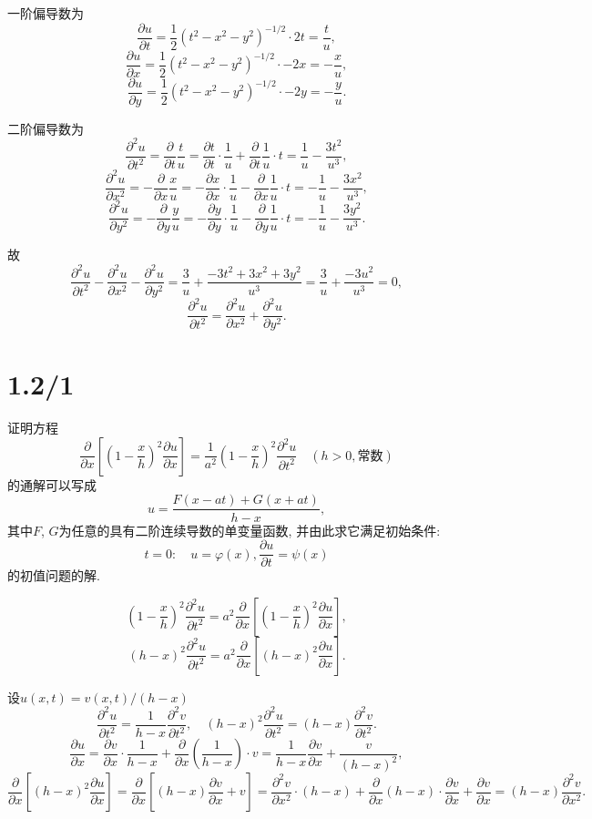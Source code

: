 \documentclass[11pt,a4paper]{article}
\begin{document}
一阶偏导数为
$$\frac{\partial u}{\partial t}=\frac{1}{2}(t^2-x^2-y^2)^{-1/2}\cdot 2t=\frac{t}{u},$$
$$\frac{\partial u}{\partial x}=\frac{1}{2}(t^2-x^2-y^2)^{-1/2}\cdot -2x=-\frac{x}{u},$$
$$\frac{\partial u}{\partial y}=\frac{1}{2}(t^2-x^2-y^2)^{-1/2}\cdot -2y=-\frac{y}{u}.$$

二阶偏导数为
$$\frac{\partial^2 u}{\partial t^2}=\frac{\partial}{\partial t}\frac{t}{u}=\frac{\partial t}{\partial t}\cdot \frac{1}{u}+\frac{\partial}{\partial t}\frac{1}{u}\cdot t=\frac{1}{u}-\frac{3t^2}{u^3},$$
$$\frac{\partial^2 u}{\partial x^2}=-\frac{\partial}{\partial x}\frac{x}{u}=-\frac{\partial x}{\partial x}\cdot \frac{1}{u}-\frac{\partial}{\partial x}\frac{1}{u}\cdot t=-\frac{1}{u}-\frac{3x^2}{u^3},$$
$$\frac{\partial^2 u}{\partial y^2}=-\frac{\partial}{\partial y}\frac{y}{u}=-\frac{\partial y}{\partial y}\cdot \frac{1}{u}-\frac{\partial}{\partial y}\frac{1}{u}\cdot t=-\frac{1}{u}-\frac{3y^2}{u^3}.$$

故
$$\frac{\partial^2 u}{\partial t^2}-\frac{\partial^2 u}{\partial x^2}-\frac{\partial^2 u}{\partial y^2}=\frac{3}{u}+\frac{-3t^2+3x^2+3y^2}{u^3}=\frac{3}{u}+\frac{-3u^2}{u^3}=0,$$
$$\frac{\partial^2 u}{\partial t^2}=\frac{\partial^2 u}{\partial x^2}+\frac{\partial^2 u}{\partial y^2}.$$

\section{1.2/1}
\begin{problem}
证明方程
$$\frac{\partial}{\partial x}\left[\left(1-\frac{x}{h}\right)^2\frac{\partial u}{\partial x}\right]=\frac{1}{a^2}\left(1-\frac{x}{h}\right)^2\frac{\partial^2u}{\partial t^2}\quad(h>0,\text{常数})$$
的通解可以写成
$$u=\frac{F(x-at)+G(x+at)}{h-x},$$
其中$F$, $G$为任意的具有二阶连续导数的单变量函数, 并由此求它满足初始条件:
$$t=0:\quad u=\varphi(x),\frac{\partial u}{\partial t}=\psi(x)$$
的初值问题的解.
\end{problem}

$$\left(1-\frac{x}{h}\right)^2\frac{\partial^2 u}{\partial t^2}=a^2\frac{\partial}{\partial x}\left[\left(1-\frac{x}{h}\right)^2\frac{\partial u}{\partial x}\right],$$
$$(h-x)^2\frac{\partial^2 u}{\partial t^2}=a^2\frac{\partial}{\partial x}\left[(h-x)^2\frac{\partial u}{\partial x}\right].$$

设$u(x,t)=v(x,t)/(h-x)$
$$\frac{\partial^2 u}{\partial t^2}=\frac{1}{h-x}\frac{\partial^2 v}{\partial t^2},\quad (h-x)^2\frac{\partial^2 u}{\partial t^2}=(h-x)\frac{\partial^2 v}{\partial t^2}.$$
$$\frac{\partial u}{\partial x}=\frac{\partial v}{\partial x}\cdot\frac{1}{h-x}+\frac{\partial}{\partial x}\left(\frac{1}{h-x}\right)\cdot v=\frac{1}{h-x}\frac{\partial v}{\partial x}+\frac{v}{(h-x)^2},$$
$$\frac{\partial}{\partial x}\left[(h-x)^2\frac{\partial u}{\partial x}\right]=\frac{\partial}{\partial x}\left[(h-x)\frac{\partial v}{\partial x}+v\right]=
  \frac{\partial^2 v}{\partial x^2}\cdot(h-x)+\frac{\partial}{\partial x}(h-x)\cdot\frac{\partial v}{\partial x}+\frac{\partial v}{\partial x}=(h-x)\frac{\partial^2 v}{\partial x^2}.$$
\end{document}
